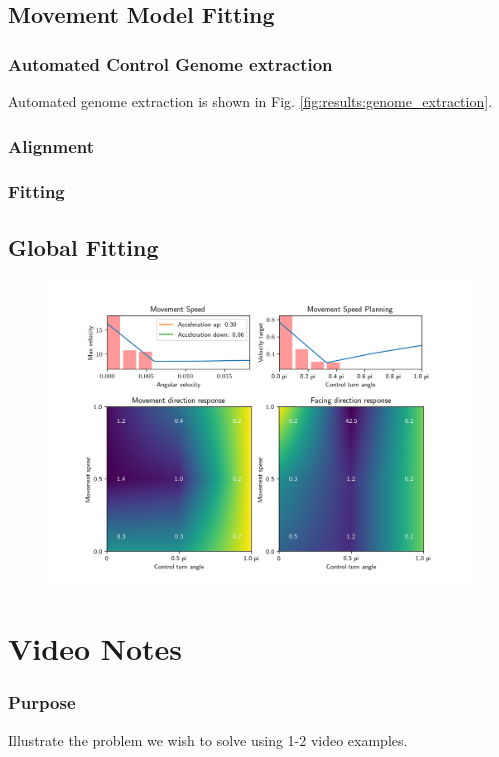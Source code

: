 \subsection{Movement Model Fitting}
\subsubsection{Automated Control Genome extraction}
Automated genome extraction is shown in Fig. \ref{fig:results:genome_extraction}.
\subsubsection{Alignment}
\subsubsection{Fitting}

\subsection{Global Fitting}

\begin{figure}
    \centering
    \includegraphics[width=1.0\columnwidth]{img/locomotion mode.png}
    \caption{}
    \label{fig:results:locomotion_mode}
\end{figure}



\section{Video Notes}

\subsubsection{Purpose}
Illustrate the problem we wish to solve using 1-2 video examples.
